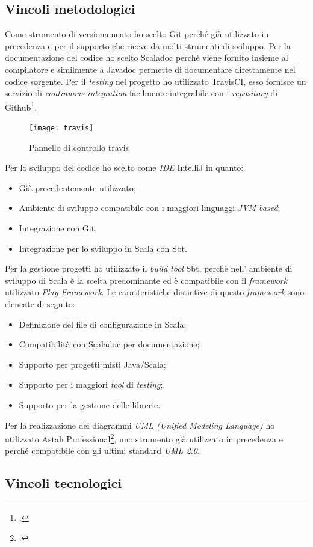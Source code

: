 \subsection{Vincoli metodologici}
Come strumento di versionamento ho scelto Git perché già utilizzato in precedenza e per il supporto che riceve da molti strumenti di sviluppo. Per la documentazione del codice ho scelto Scaladoc perchè viene fornito insieme al compilatore e similmente a Javadoc permette di documentare direttamente nel codice sorgente. Per il \emph{testing} nel progetto ho utilizzato TravisCI, esso fornisce un servizio di \emph{continuous integration} facilmente integrabile con i \emph{repository} di Github\footcite{https://github.com/}.
\begin{figure}[ht]
\centering
\texttt{[image: travis]}
\caption{Pannello di controllo travis}
\end{figure}
\newpage
Per lo sviluppo del codice ho scelto come \emph{IDE} IntelliJ in quanto:
\begin{itemize}
\item Già precedentemente utilizzato;
\item Ambiente di sviluppo compatibile con i maggiori linguaggi \emph{JVM-based};
\item Integrazione con Git;
\item Integrazione per lo sviluppo in Scala con Sbt.
\end{itemize}
Per la gestione progetti ho utilizzato il \emph{build tool} Sbt, perchè nell' ambiente di sviluppo di Scala è la scelta predominante ed è compatibile con il \emph{framework} utilizzato \emph{Play Framework}. Le caratteristiche distintive di questo \emph{framework} sono elencate di seguito:
\begin{itemize}
\item Definizione del file di configurazione in Scala;
\item Compatibilità con Scaladoc per documentazione;
\item Supporto per progetti misti Java/Scala;
\item Supporto per i maggiori \emph{tool} di \emph{testing};
\item Supporto per la gestione delle librerie.
\end{itemize}
Per la realizzazione dei diagrammi \emph{UML (Unified Modeling Language)} ho utilizzato Astah Professional\footcite{http://astah.net/}, uno strumento già utilizzato in precedenza e perché compatibile con gli ultimi standard \emph{UML 2.0}.
\subsection{Vincoli tecnologici}
